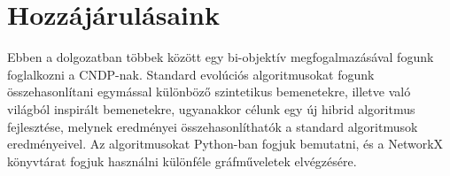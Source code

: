 \section{Hozzájárulásaink}\label{sec:HOZZAJARULASAINK}

Ebben a dolgozatban többek között egy bi-objektív megfogalmazásával fogunk foglalkozni a CNDP-nak.
Standard evolúciós algoritmusokat fogunk összehasonlítani egymással különböző szintetikus bemenetekre, illetve való világból inspirált bemenetekre,
ugyanakkor célunk egy új hibrid algoritmus fejlesztése, melynek eredményei összehasonlíthatók a standard algoritmusok eredményeivel.
Az algoritmusokat Python-ban fogjuk bemutatni, és a NetworkX könyvtárat \cite{hagberg2008exploring} fogjuk használni különféle gráfműveletek elvégzésére.
